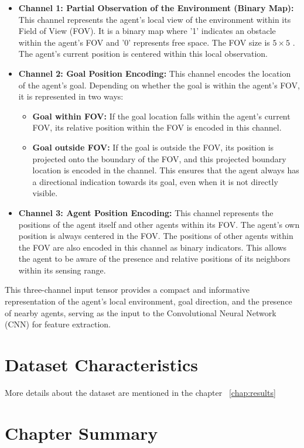 \begin{itemize}
    \item \textbf{Channel 1: Partial Observation of the Environment (Binary Map):} This channel represents the agent's local view of the environment within its Field of View (FOV). It is a binary map where '1' indicates an obstacle within the agent's FOV and '0' represents free space. The FOV size is  $5 \times 5$ . The agent's current position is centered within this local observation.
    \item \textbf{Channel 2: Goal Position Encoding:} This channel encodes the location of the agent's goal. Depending on whether the goal is within the agent's FOV, it is represented in two ways:
        \begin{itemize}
            \item \textbf{Goal within FOV:} If the goal location falls within the agent's current FOV, its relative position within the FOV is encoded in this channel.
            \item \textbf{Goal outside FOV:} If the goal is outside the FOV, its position is projected onto the boundary of the FOV, and this projected boundary location is encoded in the channel. This ensures that the agent always has a directional indication towards its goal, even when it is not directly visible.
        \end{itemize}
    \item \textbf{Channel 3: Agent Position Encoding:} This channel represents the positions of the agent itself and other agents within its FOV. The agent's own position is always centered in the FOV. The positions of other agents within the FOV are also encoded in this channel as binary indicators. This allows the agent to be aware of the presence and relative positions of its neighbors within its sensing range.
\end{itemize}

This three-channel input tensor provides a compact and informative representation of the agent's local environment, goal direction, and the presence of nearby agents, serving as the input to the Convolutional Neural Network (CNN) for feature extraction.

\section{Dataset Characteristics}
More details about the dataset are mentioned in the chapter ~\ref{chap:results}
\section{Chapter Summary}

